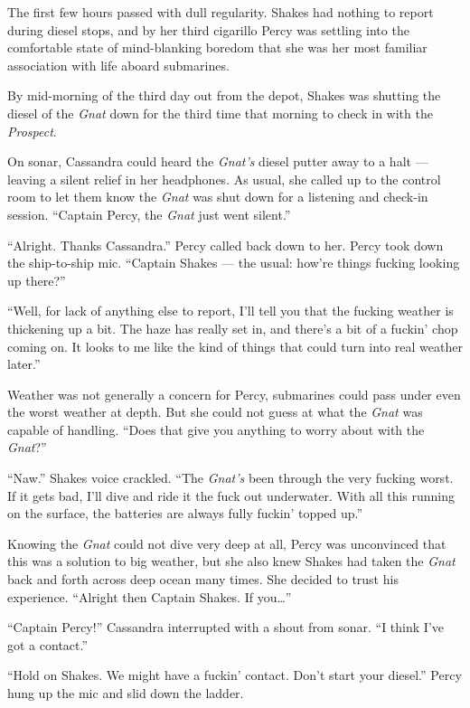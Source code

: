 \documentclass[
]{scrbook}
\begin{document}
The first few hours passed with dull regularity. Shakes had nothing to
report during diesel stops, and by her third cigarillo Percy was
settling into the comfortable state of mind-blanking boredom that she
was her most familiar association with life aboard submarines.

By mid-morning of the third day out from the depot, Shakes was shutting
the diesel of the \emph{Gnat} down for the third time that morning to
check in with the \emph{Prospect}.

On sonar, Cassandra could heard the \emph{Gnat's} diesel putter away to
a halt --- leaving a silent relief in her headphones. As usual, she
called up to the control room to let them know the \emph{Gnat} was shut
down for a listening and check-in session. ``Captain Percy, the
\emph{Gnat} just went silent.''

``Alright. Thanks Cassandra.'' Percy called back down to her. Percy took
down the ship-to-ship mic. ``Captain Shakes --- the usual: how're things
fucking looking up there?''

``Well, for lack of anything else to report, I'll tell you that the
fucking weather is thickening up a bit. The haze has really set in, and
there's a bit of a fuckin' chop coming on. It looks to me like the kind
of things that could turn into real weather later.''

Weather was not generally a concern for Percy, submarines could pass
under even the worst weather at depth. But she could not guess at what
the \emph{Gnat} was capable of handling. ``Does that give you anything
to worry about with the \emph{Gnat}?''

``Naw.'' Shakes voice crackled. ``The \emph{Gnat's} been through the
very fucking worst. If it gets bad, I'll dive and ride it the fuck out
underwater. With all this running on the surface, the batteries are
always fully fuckin' topped up.''

Knowing the \emph{Gnat} could not dive very deep at all, Percy was
unconvinced that this was a solution to big weather, but she also knew
Shakes had taken the \emph{Gnat} back and forth across deep ocean many
times. She decided to trust his experience. ``Alright then Captain
Shakes. If you\ldots{}''

``Captain Percy!'' Cassandra interrupted with a shout from sonar. ``I
think I've got a contact.''

``Hold on Shakes. We might have a fuckin' contact. Don't start your
diesel.'' Percy hung up the mic and slid down the ladder.
\end{document}
